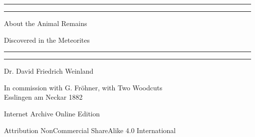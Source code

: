 \documentclass[a4paper, 12pt, oneside]{article}
\begin{document}
\begin{titlepage} %
	\centering %
	\scshape %

	
	\rule{\textwidth}{1.6pt}\vspace*{-\baselineskip}\vspace*{2pt} %
	\rule{\textwidth}{0.4pt} %
	
	\vspace{1.5\baselineskip} %
	
	{\LARGE About the Animal Remains}
	
	\vspace{1.2\baselineskip}
	
	{\LARGE Discovered in the Meteorites}
	
	\vspace{1\baselineskip} %

	\rule{\textwidth}{0.4pt}\vspace*{-\baselineskip}\vspace{3.2pt} %
	\rule{\textwidth}{1.6pt} %
	
	\vspace{1\baselineskip} %
	
	
	{Dr. David Friedrich Weinland} %
	
	\vspace*{1\baselineskip} %
	
    {\small In commission with G. Fröhner, with Two Woodcuts\\ Esslingen am Neckar 1882} %
    
    \vspace*{\fill}

	{\small\scshape }

    Internet Archive Online Edition  %
	
	{\small Attribution NonCommercial ShareAlike 4.0 International } %
\end{titlepage}
\setlength{\parskip}{1mm plus1mm minus1mm}
\clearpage
\tableofcontents
\clearpage
\end{document}
